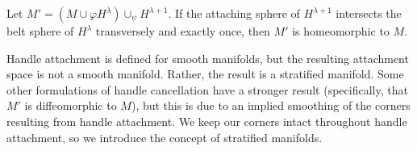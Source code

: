 \begin{prop}
	Let $M'=(M\cup\varphi H^\lambda)\cup_\psi H^{\lambda+1}$.
	If the attaching sphere of $H^{\lambda + 1}$ intersects the belt sphere of $H^\lambda$ transversely and exactly once, then $M'$ is homeomorphic to $M$.	
\end{prop}

Handle attachment is defined for smooth manifolds, but the resulting attachment space is not a smooth manifold.
Rather, the result is a stratified manifold.
Some other formulations of handle cancellation have a stronger result (specifically, that $M'$ is diffeomorphic to $M$), but this is due to an implied smoothing of the corners resulting from handle attachment.
We keep our corners intact throughout handle attachment, so we introduce the concept of stratified manifolds.
